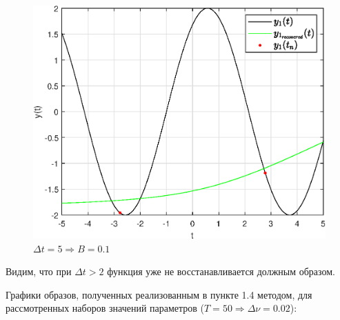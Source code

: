 \documentclass[a4paper]{article}
\begin{document}
\begin{figure}[H]
    \centering
    \includegraphics[width=0.55\linewidth]{graphs2/T_50_dt_5_B_0.1_dv_0.02/func1_recovered.eps}
    \caption{$\Delta t = 5 \Rightarrow B = 0.1$}
\end{figure}

Видим, что при $\Delta t > 2$ функция уже не восстанавливается должным образом.

Графики образов, полученных реализованным в пункте 1.4 методом, для рассмотренных наборов значений параметров ($T = 50 \Rightarrow \Delta \nu = 0.02$):
\end{document}
